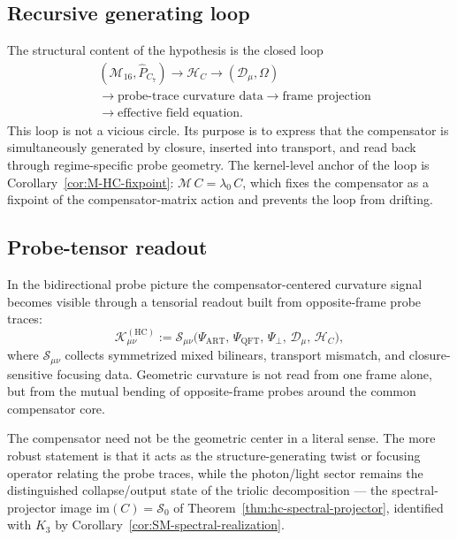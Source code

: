 \subsection*{Recursive generating loop}

The structural content of the hypothesis is the closed loop
\[
\begin{aligned}
&(\mathcal{M}_{16},\hat{P}_{C_7}) \longrightarrow \mathcal{H}_C \longrightarrow (\mathcal{D}_\mu,\Omega)\\
&\longrightarrow \text{probe-trace curvature data} \longrightarrow \text{frame projection}\\
&\longrightarrow \text{effective field equation}.
\end{aligned}
\]
This loop is not a vicious circle. Its purpose is to express that the
compensator is simultaneously generated by closure, inserted into
transport, and read back through regime-specific probe geometry.
The kernel-level anchor of the loop is
Corollary~\ref{cor:M-HC-fixpoint}: $\mathcal{M}\,C = \lambda_0\,C$,
which fixes the compensator as a fixpoint of the compensator-matrix
action and prevents the loop from drifting.

\subsection*{Probe-tensor readout}

In the bidirectional probe picture the compensator-centered curvature
signal becomes visible through a tensorial readout built from
opposite-frame probe traces:
\[
 \mathcal{K}_{\mu\nu}^{(\mathrm{HC})}
 :=
 \mathcal{S}_{\mu\nu}
 \bigl(
 \Psi_{\mathrm{ART}},\,
 \Psi_{\mathrm{QFT}},\,
 \Psi_\perp,\,
 \mathcal{D}_\mu,\,
 \mathcal{H}_C
 \bigr),
\]
where $\mathcal{S}_{\mu\nu}$ collects symmetrized mixed bilinears,
transport mismatch, and closure-sensitive focusing data.
Geometric curvature is not read from one frame alone, but from the
mutual bending of opposite-frame probes around the common compensator
core.

\begin{remark}
The compensator need not be the geometric center in a literal sense.
The more robust statement is that it acts as the structure-generating
twist or focusing operator relating the probe traces, while the
photon/light sector remains the distinguished collapse/output state of
the triolic decomposition --- the spectral-projector image
$\mathrm{im}(C) = \mathcal{S}_0$ of Theorem~\ref{thm:hc-spectral-projector},
identified with $K_3$ by Corollary~\ref{cor:SM-spectral-realization}.
\end{remark}


